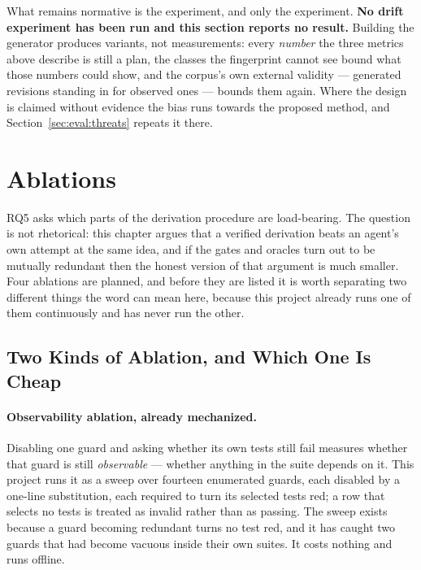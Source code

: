 What remains normative is the experiment, and only the experiment. \textbf{No drift experiment
has been run and this section reports no result.} Building the generator produces variants, not
measurements: every \emph{number} the three metrics above describe is still a plan, the classes
the fingerprint cannot see bound what those numbers could show, and the corpus's own external
validity --- generated revisions standing in for observed ones --- bounds them again. Where the
design is claimed without evidence the bias runs towards the proposed method, and
Section~\ref{sec:eval:threats} repeats it there.

\section{Ablations}
\label{sec:eval:ablation}


RQ5 asks which parts of the derivation procedure are load-bearing. The question is not
rhetorical: this chapter argues that a verified derivation beats an agent's own attempt at the
same idea, and if the gates and oracles turn out to be mutually redundant then the honest
version of that argument is much smaller. Four ablations are planned, and before they are
listed it is worth separating two different things the word can mean here, because this
project already runs one of them continuously and has never run the other.

\subsection{Two Kinds of Ablation, and Which One Is Cheap}

\paragraph{Observability ablation, already mechanized.}
Disabling one guard and asking whether its own tests still fail measures whether that guard is
still \emph{observable} --- whether anything in the suite depends on it. This project runs it
as a sweep over fourteen enumerated guards, each disabled by a one-line substitution, each
required to turn its selected tests red; a row that selects no tests is treated as invalid
rather than as passing. The sweep exists because a guard becoming redundant turns no test red,
and it has caught two guards that had become vacuous inside their own suites. It costs nothing
and runs offline.

